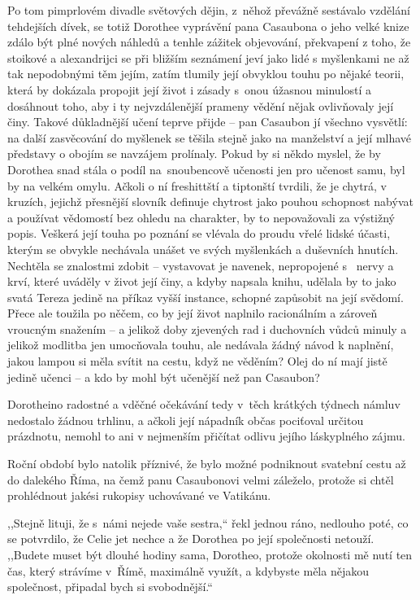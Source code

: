 Po tom pimprlovém divadle světových dějin, z něhož převážně sestávalo vzdělání tehdejších dívek, se totiž Dorothee vyprávění pana Casaubona o jeho velké knize zdálo být plné nových náhledů a tenhle zážitek objevování, překvapení z toho, že stoikové a alexandrijci se při bližším seznámení jeví jako lidé s myšlenkami ne až tak nepodobnými těm jejím, zatím tlumily její obvyklou touhu po nějaké teorii, která by dokázala propojit její život i zásady s onou úžasnou minulostí a dosáhnout toho, aby i ty nejvzdálenější prameny vědění nějak ovlivňovaly její činy. Takové důkladnější učení teprve přijde -- pan Casaubon jí všechno vysvětlí: na další zasvěcování do myšlenek se těšila stejně jako na manželství a její mlhavé představy o obojím se navzájem prolínaly. Pokud by si někdo myslel, že by Dorothea snad stála o podíl na snoubencově učenosti jen pro učenost samu, byl by na velkém omylu. Ačkoli o ní freshittští a tiptonští tvrdili, že je chytrá, v kruzích, jejichž přesnější slovník definuje chytrost jako pouhou schopnost nabývat a používat vědomostí bez ohledu na charakter, by to nepovažovali za výstižný popis. Veškerá její touha po poznání se vlévala do proudu vřelé lidské účasti, kterým se obvykle nechávala unášet ve svých myšlenkách a duševních hnutích. Nechtěla se znalostmi zdobit -- vystavovat je navenek, nepropojené s  nervy a krví, které uváděly v život její činy, a kdyby napsala knihu, udělala by to jako svatá Tereza jedině na příkaz vyšší instance, schopné zapůsobit na její svědomí. Přece ale toužila po něčem, co by její život naplnilo racionálním a zároveň vroucným snažením -- a jelikož doby zjevených rad i duchovních vůdců minuly a jelikož modlitba jen umocňovala touhu, ale nedávala žádný návod k naplnění, jakou lampou si měla svítit na cestu, když ne věděním? Olej do ní mají jistě jedině učenci -- a kdo by mohl být učenější než pan Casaubon?

Dorotheino radostné a vděčné očekávání tedy v těch krátkých týdnech námluv nedostalo žádnou trhlinu, a ačkoli její nápadník občas pociťoval určitou prázdnotu, nemohl to ani v nejmenším přičítat odlivu jejího láskyplného zájmu.       
     
Roční období bylo natolik příznivé, že bylo možné podniknout svatební cestu až do dalekého Říma, na čemž panu Casaubonovi velmi záleželo, protože si chtěl prohlédnout jakési rukopisy uchovávané ve Vatikánu. 

,,Stejně lituji, že s námi nejede vaše sestra,`` řekl jednou ráno, nedlouho poté, co se potvrdilo, že Celie jet nechce a že Dorothea po její společnosti netouží. ,,Budete muset být dlouhé hodiny sama, Dorotheo, protože okolnosti mě nutí ten čas, který strávíme v Římě, maximálně využít, a kdybyste měla nějakou společnost, připadal bych si svobodnější.``

